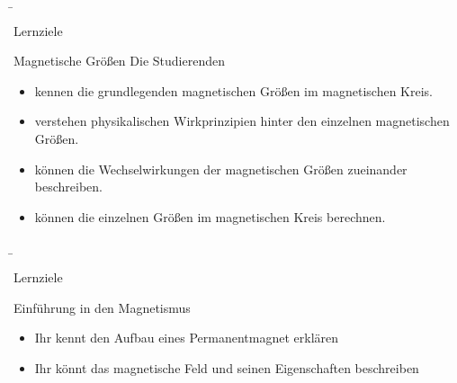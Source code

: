 \b{
	\begin{frame}{Lernziele}
		\begin{Lernziele}{Magnetische Größen}
			Die Studierenden
			\begin{itemize}
				\item kennen die grundlegenden magnetischen Größen im magnetischen Kreis.
				\item verstehen physikalischen Wirkprinzipien hinter den einzelnen magnetischen Größen.
				\item können die Wechselwirkungen der magnetischen Größen zueinander beschreiben.
				\item können die einzelnen Größen im magnetischen Kreis berechnen.
			\end{itemize}
		\end{Lernziele}
	\end{frame}
}
\b{
	\begin{frame}{Lernziele}
		\begin{Lernziele}{Einführung in den Magnetismus}
			\begin{itemize}
				\item Ihr kennt den Aufbau eines Permanentmagnet erklären
				\item Ihr könnt das magnetische Feld und seinen Eigenschaften beschreiben
			\end{itemize}
		\end{Lernziele}
	\end{frame}
}

